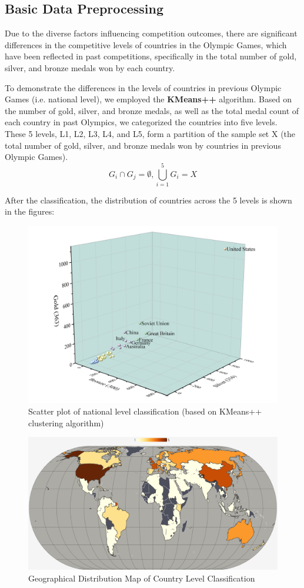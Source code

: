 \documentclass[12pt]{article}  %
\begin{document}
\subsection{Basic Data Preprocessing}
Due to the diverse factors influencing competition outcomes, there are significant differences in the competitive levels of countries in the Olympic Games, which have been reflected in past competitions, specifically in the total number of gold, silver, and bronze medals won by each country. 

To demonstrate the differences in the levels of countries in previous Olympic Games (i.e. national level), we employed the \textbf{KMeans++} algorithm. Based on the number of gold, silver, and bronze medals, as well as the total medal count of each country in past Olympics, we categorized the countries into five levels. These 5 levels, L1, L2, L3, L4, and L5, form a partition of the sample set X (the total number of gold, silver, and bronze medals won by countries in previous Olympic Games).
\begin{equation}
G_{i} \cap G_{j}=\emptyset, \bigcup_{i=1}^{5} G_{i}=X
\end{equation}

After the classification, the distribution of countries across the 5 levels is shown in the figures:
\begin{figure}[H]
	\centering
	\includegraphics[width=12cm]{img/Level1.png}
	\caption{Scatter plot of national level classification (based on KMeans++ clustering algorithm)}
	\label{fig:aa}
\end{figure}

\begin{figure}[H]
	\centering
	\includegraphics[width=12cm]{img/Level2.png}
	\caption{Geographical Distribution Map of Country Level Classification}
	\label{fig:aa}
\end{figure}
\end{document}
